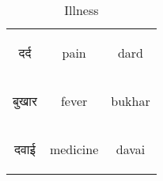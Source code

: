 \begin{table}[H]
    \centering
    \begin{tabular}{c|c|c}
        \begin{hindi} दर्द \end{hindi} & pain & dard \\  
        \begin{hindi} बुखार \end{hindi} & fever & bukhar \\  
        \begin{hindi} दवाई \end{hindi} & medicine & davai \\ 
    \end{tabular}
    \caption{Illness}
    \label{tab:nouns_illness}
\end{table}

